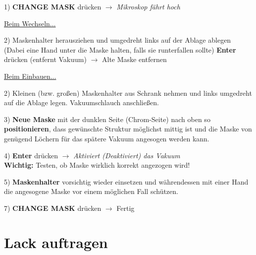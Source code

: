\documentclass[12pt,a4paper]{article}
\begin{document}
\begin{description}

\item 1) \textbf{CHANGE MASK} drücken $\rightarrow$ \textit{Mikroskop fährt hoch}

\begin{description}

\item \underline{Beim Wechseln...}
\item 2) Maskenhalter herausziehen und umgedreht links auf der Ablage ablegen (Dabei eine Hand unter die Maske halten, falls sie runterfallen sollte)\newline
\textbf{Enter} drücken (entfernt Vakuum) $\rightarrow$ Alte Maske entfernen

\item \underline{Beim Einbauen...}
\item 2) Kleinen (bzw. großen) Maskenhalter aus Schrank nehmen und links umgedreht auf die Ablage legen. Vakuumschlauch anschließen.

\end{description}

\item 3) \textbf{Neue Maske} mit der dunklen Seite (Chrom-Seite) nach oben so \textbf{positionieren}, dass gewünschte Struktur möglichst mittig ist und die Maske von genügend Löchern für das spätere Vakuum angesogen werden kann.

\item 4) \textbf{Enter} drücken $\rightarrow$ \textit{Aktiviert (Deaktiviert) das Vakuum}\\
\textbf{Wichtig:} Testen, ob Maske wirklich korrekt angezogen wird!

\item 5) \textbf{Maskenhalter} vorsichtig wieder einsetzen und währendessen mit einer Hand die angesogene Maske vor einem möglichen Fall schützen.

\item 7) \textbf{CHANGE MASK} drücken $\rightarrow$ Fertig
\end{description}

\newpage

\section{Lack auftragen}
\end{document}
